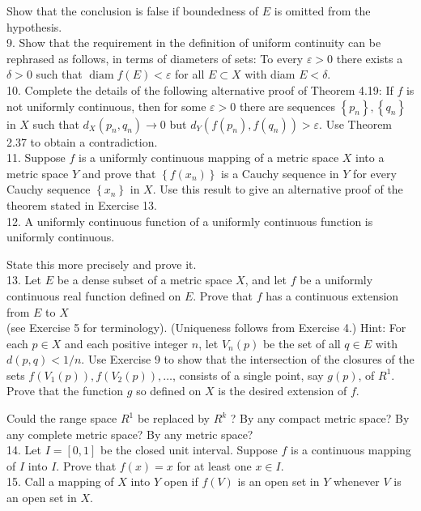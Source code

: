 \documentclass[10pt]{article}
\begin{document}
Show that the conclusion is false if boundedness of $E$ is omitted from the hypothesis.\\
9. Show that the requirement in the definition of uniform continuity can be rephrased as follows, in terms of diameters of sets: To every $\varepsilon>0$ there exists a $\delta>0$ such that $\operatorname{diam} f(E)<\varepsilon$ for all $E \subset X$ with diam $E<\delta$.\\
10. Complete the details of the following alternative proof of Theorem 4.19: If $f$ is not uniformly continuous, then for some $\varepsilon>0$ there are sequences $\left\{p_{n}\right\},\left\{q_{n}\right\}$ in $X$ such that $d_{X}\left(p_{n}, q_{n}\right) \rightarrow 0$ but $d_{Y}\left(f\left(p_{n}\right), f\left(q_{n}\right)\right)>\varepsilon$. Use Theorem 2.37 to obtain a contradiction.\\
11. Suppose $f$ is a uniformly continuous mapping of a metric space $X$ into a metric space $Y$ and prove that $\left\{f\left(x_{n}\right)\right\}$ is a Cauchy sequence in $Y$ for every Cauchy sequence $\left\{x_{n}\right\}$ in $X$. Use this result to give an alternative proof of the theorem stated in Exercise 13.\\
12. A uniformly continuous function of a uniformly continuous function is uniformly continuous.

State this more precisely and prove it.\\
13. Let $E$ be a dense subset of a metric space $X$, and let $f$ be a uniformly continuous real function defined on $E$. Prove that $f$ has a continuous extension from $E$ to $X$\\
(see Exercise 5 for terminology). (Uniqueness follows from Exercise 4.) Hint: For each $p \in X$ and each positive integer $n$, let $V_{n}(p)$ be the set of all $q \in E$ with $d(p, q)<1 / n$. Use Exercise 9 to show that the intersection of the closures of the sets $f\left(V_{1}(p)\right), f\left(V_{2}(p)\right), \ldots$, consists of a single point, say $g(p)$, of $R^{1}$. Prove that the function $g$ so defined on $X$ is the desired extension of $f$.

Could the range space $R^{1}$ be replaced by $R^{k}$ ? By any compact metric space? By any complete metric space? By any metric space?\\
14. Let $I=[0,1]$ be the closed unit interval. Suppose $f$ is a continuous mapping of $I$ into $I$. Prove that $f(x)=x$ for at least one $x \in I$.\\
15. Call a mapping of $X$ into $Y$ open if $f(V)$ is an open set in $Y$ whenever $V$ is an open set in $X$.
\end{document}
